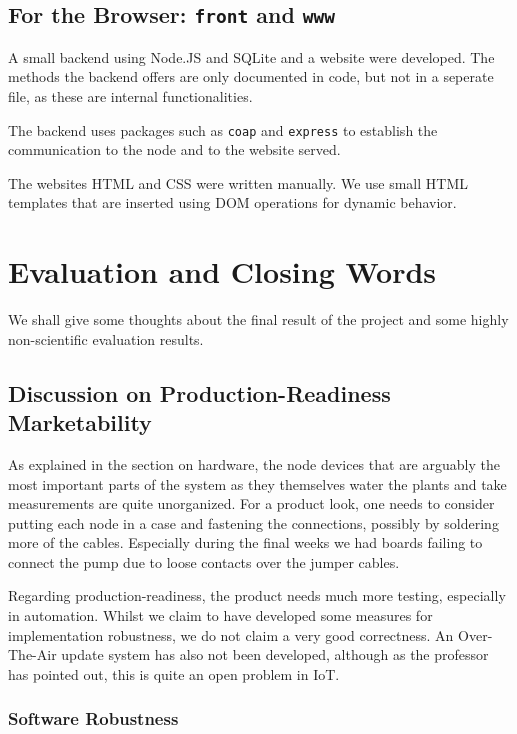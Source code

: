 \documentclass[acmtog, language=english, nonacm]{acmart}
\begin{document}
    \subsection{For the Browser: \texttt{front} and \texttt{www}}

    A small backend using Node.JS and SQLite and a website were developed. The methods the backend offers are only documented in code, but not in a seperate file, as these are internal functionalities.

    The backend uses packages such as \texttt{coap} and \texttt{express} to establish the communication to the node and to the website served.
    
    The websites HTML and CSS were written manually. We use small HTML templates that are inserted using DOM operations for dynamic behavior.

    \section{Evaluation and Closing Words}

    We shall give some thoughts about the final result of the project and some highly non-scientific evaluation results.

    \subsection{Discussion on Production-Readiness Marketability}

    As explained in the section on hardware, the node devices that are arguably the most important parts of the system as they themselves water the plants and take measurements are quite unorganized. For a product look, one needs to consider putting each node in a case and fastening the connections, possibly by soldering more of the cables. Especially during the final weeks we had boards failing to connect the pump due to loose contacts over the jumper cables.

    Regarding production-readiness, the product needs much more testing, especially in automation. Whilst we claim to have developed some measures for implementation robustness, we do not claim a very good correctness. An Over-The-Air update system has also not been developed, although as the professor has pointed out, this is quite an open problem in IoT.

    \subsubsection{Software Robustness}
\end{document}
